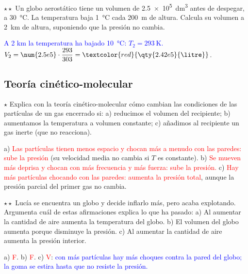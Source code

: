 \begin{exercise}
    \(\star\star\) Un globo aerostático tiene un volumen de \qty{2.5e5}{\cubic\deci\metre} antes de despegar, a \qty{30}{\degreeCelsius}.
    La temperatura baja \qty{1}{\degreeCelsius} cada \qty{200}{\metre} de altura. Calcula su volumen a \qty{2}{\kilo\metre} de altura,
    suponiendo que la presión no cambia.
    \begin{solu}
        \textcolor{blue}{A 2 km la temperatura ha bajado \qty{10}{\degreeCelsius}: \(T_2 = \qty{293}{\kelvin}\).}
        \(V_2 = \num{2.5e5} \cdot \dfrac{293}{303} = \textcolor{red}{\qty{2.42e5}{\litre}}\).
    \end{solu}
\end{exercise}

\subsection{Teoría cinético-molecular}

\begin{exercise}
    \(\star\) Explica con la teoría cinético-molecular cómo cambian las condiciones de las partículas de un gas encerrado si:
    a) reducimos el volumen del recipiente; b) aumentamos la temperatura a volumen constante; c) añadimos al recipiente un gas
    inerte (que no reacciona).
    \begin{solu}
        a) \textcolor{red}{Las partículas tienen menos espacio y chocan más a menudo con las paredes: sube la presión} (su velocidad media
        no cambia si \(T\) es constante). b) \textcolor{red}{Se mueven más deprisa y chocan con más frecuencia y más fuerza: sube la
        presión.} c) \textcolor{red}{Hay más partículas chocando con las paredes: aumenta la presión total}, aunque la presión parcial
        del primer gas no cambia.
    \end{solu}
\end{exercise}

\begin{exercise}
    \(\star\star\) Lucía se encuentra un globo y decide inflarlo más, pero acaba explotando. Argumenta cuál de estas afirmaciones
    explica lo que ha pasado: a) Al aumentar la cantidad de aire aumenta la temperatura del globo. b) El volumen del globo
    aumenta porque disminuye la presión. c) Al aumentar la cantidad de aire aumenta la presión interior.
    \begin{solu}
        a) \textcolor{red}{F}. b) \textcolor{red}{F}. c) \textcolor{red}{V}: \textcolor{blue}{con más partículas hay más choques contra la pared del globo; la goma se
        estira hasta que no resiste la presión.}
    \end{solu}
\end{exercise}

